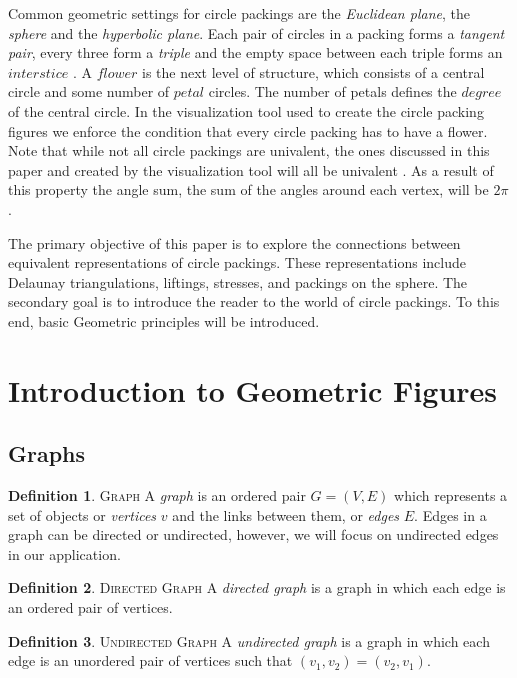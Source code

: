 \documentclass[11pt]{article}
\theoremstyle{definition}
\newtheorem{definition}{Definition}[section]
\begin{document}
	Common geometric settings for circle packings are the \emph{Euclidean plane}, the \emph{sphere} and the \emph{hyperbolic plane}. 
	Each pair of circles in a packing forms a \emph{tangent pair}, every three form a \emph{triple} and the empty space between each triple forms an $interstice$ \cite{stephenson05introduction}. 
	A $flower$ is the next level of structure, which consists of a central circle and some number of $petal$ circles. 
	The number of petals defines the $degree$ of the central circle. 
	In the visualization tool used to create the circle packing figures we enforce the condition that every circle packing has to have a flower. 
	Note that while not all circle packings are univalent, the ones discussed in this paper and created by the visualization tool will all be univalent \cite{visualizationTool}. 
	As a result of this property the angle sum, the sum of the angles around each vertex, will be $2\pi$.

	The primary objective of this paper is to explore the connections between equivalent representations of circle packings. 
	These representations include Delaunay triangulations, liftings, stresses, and packings on the sphere. 
	The secondary goal is to introduce the reader to the world of circle packings. To this end, basic Geometric principles will be introduced.

\section{Introduction to Geometric Figures}
\subsection{Graphs}
	\theoremstyle{definition}
	\begin{definition}{\textsc{Graph}}
		A \emph{graph} is an ordered pair $G=(V,E)$ which represents a set of objects or \emph{vertices} $v$ and the links between them, or \emph{edges} $E$. 
		Edges in a graph can be directed or undirected, however, we will focus on undirected edges in our application. 
	\end{definition}
	
	\theoremstyle{definition}
	\begin{definition}{\textsc{Directed Graph}}
  		A \emph{directed graph} is a graph in which each edge is an ordered pair of vertices.
	\end{definition}
	
	\theoremstyle{definition}
	\begin{definition}{\textsc{Undirected Graph}}
  		A \emph{undirected graph} is a graph in which each edge is an unordered pair of vertices such that $(v_1, v_2) = (v_2, v_1)$.
  	\end{definition}
	
\end{document}

